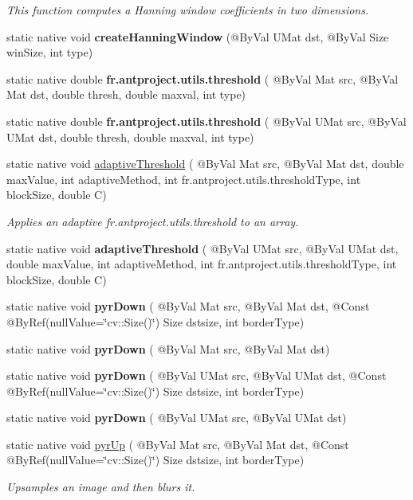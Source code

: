 \begin{DoxyCompactItemize}
\begin{DoxyCompactList}\small\item\em This function computes a Hanning window coefficients in two dimensions. \end{DoxyCompactList}\item 
static native void {\bfseries create\+Hanning\+Window} (@By\+Val U\+Mat dst, @By\+Val Size win\+Size, int type)
\item 
static native double {\bfseries fr.antproject.utils.threshold} ( @By\+Val Mat src, @By\+Val Mat dst, double thresh, double maxval, int type)
\item 
static native double {\bfseries fr.antproject.utils.threshold} ( @By\+Val U\+Mat src, @By\+Val U\+Mat dst, double thresh, double maxval, int type)
\item 
static native void \hyperlink{group__imgproc__misc_ga7901ddcd72f108577c88250a35b9ccbd}{adaptive\+Threshold} ( @By\+Val Mat src, @By\+Val Mat dst, double max\+Value, int adaptive\+Method, int fr.antproject.utils.threshold\+Type, int block\+Size, double C)
\begin{DoxyCompactList}\small\item\em Applies an adaptive fr.antproject.utils.threshold to an array. \end{DoxyCompactList}\item
static native void {\bfseries adaptive\+Threshold} ( @By\+Val U\+Mat src, @By\+Val U\+Mat dst, double max\+Value, int adaptive\+Method, int fr.antproject.utils.threshold\+Type, int block\+Size, double C)
\item 
static native void {\bfseries pyr\+Down} ( @By\+Val Mat src, @By\+Val Mat dst, @Const @By\+Ref(null\+Value=\char`\"{}cv\+::\+Size()\char`\"{}) Size dstsize, int border\+Type)
\item 
static native void {\bfseries pyr\+Down} ( @By\+Val Mat src, @By\+Val Mat dst)
\item 
static native void {\bfseries pyr\+Down} ( @By\+Val U\+Mat src, @By\+Val U\+Mat dst, @Const @By\+Ref(null\+Value=\char`\"{}cv\+::\+Size()\char`\"{}) Size dstsize, int border\+Type)
\item 
static native void {\bfseries pyr\+Down} ( @By\+Val U\+Mat src, @By\+Val U\+Mat dst)
\item 
static native void \hyperlink{group__imgproc__filter_ga3fc37612b218d8cee2f4b099a8d0a2aa}{pyr\+Up} ( @By\+Val Mat src, @By\+Val Mat dst, @Const @By\+Ref(null\+Value=\char`\"{}cv\+::\+Size()\char`\"{}) Size dstsize, int border\+Type)
\begin{DoxyCompactList}\small\item\em Upsamples an image and then blurs it. \end{DoxyCompactList}\item 

\end{DoxyCompactItemize}
